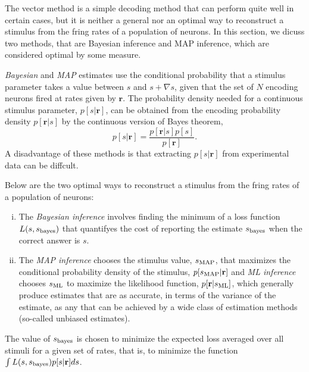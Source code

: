 \begin{rem}
  The vector method is a simple decoding method that can perform quite
well in certain cases, but it is neither a general nor an optimal way
to reconstruct a stimulus from the fring rates of a population of
neurons. In
this section, we dicuss two methods, that are Bayesian inference and MAP
inference, which are considered optimal by some measure.
\end{rem}

\begin{rem}
  \emph{Bayesian} and \emph{MAP} estimates use the conditional
  probability that a stimulus parameter takes a value between $s$ and
  $s+\nabla s$, given that the set of $N$ encoding neurons fired at
  rates given by $\mathbf{r}$. The probability density needed for a
  continuous stimulus parameter, $p[s|\mathbf{r}]$, can be obtained from
  the encoding probability density $p[\mathbf{r}|s]$ by the continuous version of Bayes
theorem,
\begin{equation}
  \label{eq:3.26}
  p[s|\mathbf{r}]=\frac{p[\mathbf{r}|s]p[s]}{p[\mathbf{r}]}.
\end{equation}
A disadvantage of these methods is that extracting $p[s|\mathbf{r}]$ from experimental data can be diffcult.
\end{rem}

\begin{defn}
  Below are the two optimal ways to reconstruct a stimulus from the
  fring rates of a population of neurons:
  \begin{enumerate}[(i)]
  \item The \emph{Bayesian inference} involves finding the minimum of a loss
  function $L(s,s_{\rm{bayes}})$ that quantifyes the cost of reporting
  the estimate $s_{\rm{bayes}}$ when the correct answer is $s$.
  \item  The \emph{MAP inference} chooses the stimulus value, $s_{\rm{MAP}}$,
  that maximizes the conditional probability density of the stimulus,
  $p[s_{\rm{MAP}}|\mathbf{r}]$ and \emph{ML inference} chooses
  $s_{\rm{ML}}$ to maximize the likelihood function,
  $p[\mathbf{r}|s_{\rm{ML}}]$, which generally produce estimates
  that are as accurate, in terms of the variance of the estimate, as
  any that can be achieved by a wide class of estimation methods
  (so-called unbiased estimates).
  \end{enumerate}
\end{defn}

\begin{rem}
  The value of $s_{\rm{bayes}}$ is chosen to minimize the expected
loss averaged over all stimuli for a given set of rates, that is, to minimize
the function $\int L(s,s_{\rm{bayes}})p[s|\mathbf{r}]ds$.
\end{rem}

